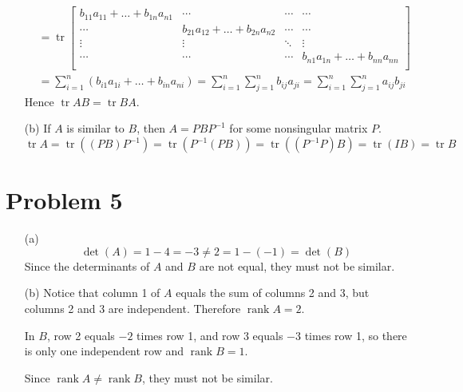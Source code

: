 \documentclass{article}
\newcommand*{\problem}[1]{\section*{Problem #1}}
\DeclareMathOperator{\rank}{rank}
\DeclareMathOperator{\trace}{tr}
\begin{document}
\begin{itemize}
\begin{align*}
		&=\trace\begin{bmatrix}
			b_{11}a_{11}+\ldots+b_{1n}a_{n1} & \cdots & \cdots & \cdots \\
			\cdots & b_{21}a_{12}+\ldots+b_{2n}a_{n2} & \cdots & \cdots \\
			\vdots & \vdots & \ddots &\vdots \\
			\cdots & \cdots & \cdots & b_{n1}a_{1n}+\ldots+b_{nn}a_{nn}  \\
		\end{bmatrix} \\
		&=\sum_{i=1}^{n} \left(b_{i1}a_{1i}+\ldots+b_{in}a_{ni}\right)
		=\sum_{i=1}^{n} \sum_{j=1}^{n} b_{ij}a_{ji}
		=\sum_{i=1}^{n} \sum_{j=1}^{n} a_{ij}b_{ji}
	\end{align*}
	Hence $\trace AB=\trace BA$.

	\item[(b)]
	If $A$ is similar to $B$, then $A=PBP^{-1}$ for some nonsingular matrix $P$.
	\begin{equation*}
		\trace A
		=\trace \left((PB)P^{-1}\right)
		=\trace \left(P^{-1}(PB)\right)
		=\trace \left( \left(P^{-1}P\right)B\right)
		=\trace (IB)
		=\trace B
	\end{equation*}
\end{itemize}

\problem{5}
\begin{itemize}
	\item[(a)]
		\begin{equation*}
		    \det(A)=1-4=-3 \neq 2=1-(-1)=\det(B)
		\end{equation*}
		Since the determinants of $A$ and $B$ are not equal, they must not be similar.
	
	\item[(b)]
		Notice that column 1 of $A$ equals the sum of columns 2 and 3, but columns 2 and 3 are independent. Therefore $\rank A=2$.

		In $B$, row 2 equals $-2$ times row 1, and row 3 equals $-3$ times row 1, so there is only one independent row and $\rank B=1$.

		Since $\rank A\neq \rank B$, they must not be similar.
\end{itemize}
\end{document}
